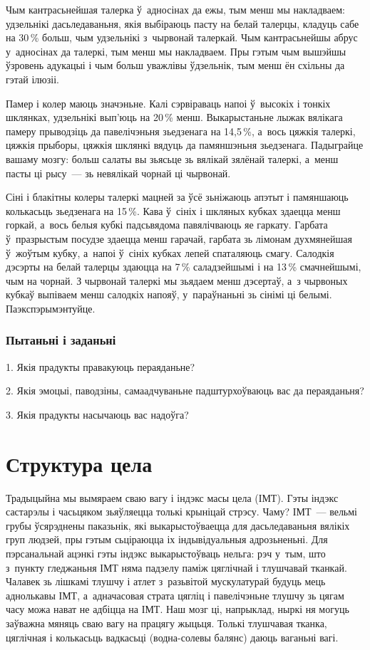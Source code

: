 Чым кантрасьнейшая талерка ў~адносінах да ежы, тым менш мы накладваем: удзельнікі дасьледаваньня, якія выбіраюць пасту на белай талерцы, кладуць сабе на 30\,\% больш, чым удзельнікі з~чырвонай талеркай. Чым кантрасьнейшы абрус у~адносінах да талеркі, тым менш мы накладваем. Пры гэтым чым вышэйшы ўзровень адукацыі і чым больш уважлівы ўдзельнік, тым менш ён схільны да гэтай ілюзіі.

Памер і колер маюць значэньне. Калі сэрвіраваць напоі ў~высокіх і тонкіх шклянках, удзельнікі вып'юць на 20\,\% менш. Выкарыстаньне лыжак вялікага памеру прыводзіць да павелічэньня зьедзенага на 14,5\,\%, а~вось цяжкія талеркі, цяжкія прыборы, цяжкія шклянкі вядуць да памяншэньня зьедзенага. Падыграйце вашаму мозгу: больш салаты вы зьясьце зь вялікай зялёнай талеркі, а~менш пасты ці рысу~--- зь невялікай чорнай ці чырвонай.

Сіні і блакітны колеры талеркі мацней за ўсё зьніжаюць апэтыт і памяншаюць колькасьць зьедзенага на 15\,\%. Кава ў~сініх і шкляных кубках здаецца менш горкай, а~вось белыя кубкі падсьвядома павялічваюць яе гаркату. Гарбата ў~празрыстым посудзе здаецца менш гарачай, гарбата зь лімонам духмянейшая ў~жоўтым кубку, а~напоі ў~сініх кубках лепей спаталяюць смагу. Салодкія дэсэрты на белай талерцы здаюцца на 7\,\% саладзейшымі і на 13\,\% смачнейшымі, чым на чорнай. З чырвонай талеркі мы зьядаем менш дэсертаў, а~з чырвоных кубкаў выпіваем менш салодкіх напояў, у~параўнаньні зь сінімі ці белымі. Паэкспэрымэнтуйце.

\subsubsection{Пытаньні і заданьні}

1. Якія прадукты правакуюць пераяданьне?

2. Якія эмоцыі, паводзіны, самаадчуваньне падштурхоўваюць вас да пераяданьня?

3. Якія прадукты насычаюць вас надоўга?


\section{Структура цела}

Традыцыйна мы вымяраем сваю вагу і індэкс масы цела (ІМТ). Гэты індэкс састарэлы і часьцяком зьяўляецца толькі крыніцай стрэсу. Чаму? ІМТ~--- вельмі грубы ўсярэднены паказьнік, які выкарыстоўваецца для дасьледаваньня вялікіх груп людзей, пры гэтым сьціраюцца іх індывідуальныя адрозьненьні. Для пэрсанальнай ацэнкі гэты індэкс выкарыстоўваць нельга: рэч у~тым, што з~пункту гледжаньня ІМТ няма падзелу паміж цяглічнай і тлушчавай тканкай. Чалавек зь лішкамі тлушчу і атлет з~разьвітой мускулатурай будуць мець аднолькавы ІМТ, а~адначасовая страта цягліц і павелічэньне тлушчу зь цягам часу можа нават не адбіцца на ІМТ. Наш мозг ці, напрыклад, ныркі ня могуць заўважна мяняць сваю вагу на працягу жыцьця. Толькі тлушчавая тканка, цяглічная і колькасьць вадкасьці (водна-солевы балянс) даюць ваганьні вагі.

